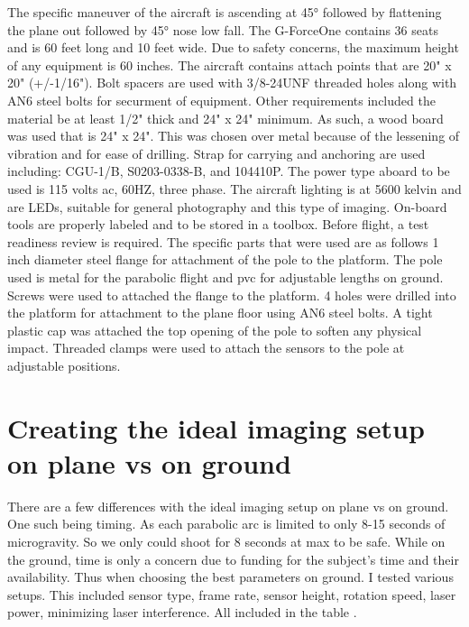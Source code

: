 The specific maneuver of the aircraft is ascending at \ang{45} followed by flattening the plane out followed by \ang{45} nose low fall. The G-ForceOne contains 36 seats and is 60 feet long and 10 feet wide. Due to safety concerns, the maximum height of any equipment is 60 inches. The aircraft contains attach points that are 20" x 20" (+/-1/16"). Bolt spacers are used with 3/8-24UNF threaded holes along with AN6 steel bolts for securment of equipment. Other requirements included the material be at least 1/2" thick and 24" x 24" minimum. As such, a wood board was used that is 24" x 24". This was chosen over metal because of the lessening of vibration and for ease of drilling. Strap for carrying and anchoring are used including: CGU-1/B, S0203-0338-B, and 104410P. The power type aboard to be used is 115 volts ac, 60HZ, three phase. The aircraft lighting is at 5600 kelvin and are LEDs, suitable for general photography and this type of imaging. On-board tools are properly labeled and to be stored in a toolbox. Before flight, a test readiness review is required.
The specific parts that were used are as follows 1 inch diameter steel flange for attachment of the pole to the platform. The pole used is metal for the parabolic flight and pvc for adjustable lengths on ground. Screws were used to attached the flange to the platform. 4 holes were drilled into the platform for attachment to the plane floor using AN6 steel bolts. A tight plastic cap was attached the top opening of the pole to soften any physical impact. Threaded clamps were used to attach the sensors to the pole at adjustable positions.

\section{Creating the ideal imaging setup on plane vs on ground}
There are a few differences with the ideal imaging setup on plane vs on ground. One such being timing. As each parabolic arc is limited to only 8-15 seconds of microgravity. So we only could shoot for 8 seconds at max to be safe. While on the ground, time is only a concern due to funding for the subject's time and their availability. Thus when choosing the best parameters on ground. I tested various setups. This included sensor type, frame rate, sensor height, rotation speed, laser power, minimizing laser interference. All included in the table .
